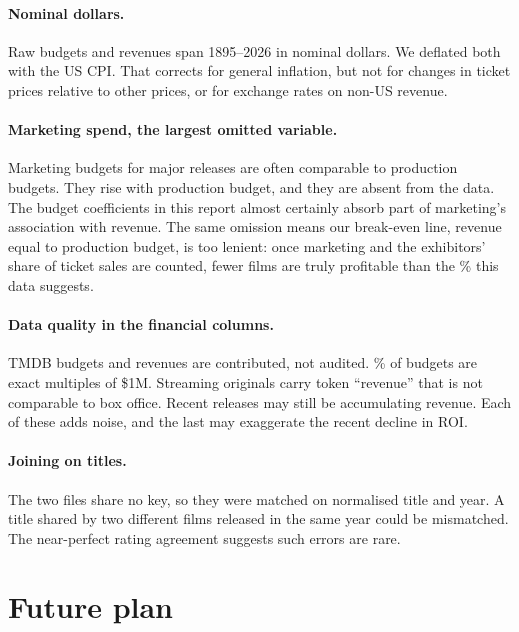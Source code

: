 \documentclass[a4paper,12pt]{report}
\begin{document}
\paragraph{Nominal dollars.} Raw budgets and revenues span 1895--2026 in nominal dollars. We deflated both with the US CPI. That corrects for general inflation, but not for changes in ticket prices relative to other prices, or for exchange rates on non-US revenue.

\paragraph{Marketing spend, the largest omitted variable.} Marketing budgets for major releases are often comparable to production budgets. They rise with production budget, and they are absent from the data. The budget coefficients in this report almost certainly absorb part of marketing's association with revenue. The same omission means our break-even line, revenue equal to production budget, is too lenient: once marketing and the exhibitors' share of ticket sales are counted, fewer films are truly profitable than the \FeatPctProfitable\% this data suggests.

\paragraph{Data quality in the financial columns.} TMDB budgets and revenues are contributed, not audited. \MultiPctBudgetsRoundMillion\% of budgets are exact multiples of \$1M. Streaming originals carry token ``revenue'' that is not comparable to box office. Recent releases may still be accumulating revenue. Each of these adds noise, and the last may exaggerate the recent decline in ROI.

\paragraph{Joining on titles.} The two files share no key, so they were matched on normalised title and year. A title shared by two different films released in the same year could be mismatched. The near-perfect rating agreement suggests such errors are rare.

\section{Future plan}
\end{document}
